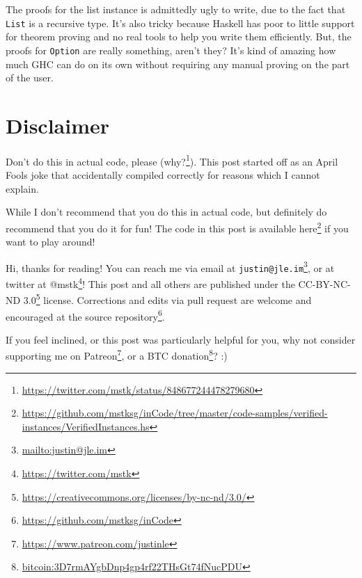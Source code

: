 \documentclass[]{article}
\renewcommand{\href}[2]{#2\footnote{\url{#1}}}
\begin{document}
The proofs for the list instance is admittedly ugly to write, due to the fact
that \texttt{List} is a recursive type. It's also tricky because Haskell has
poor to little support for theorem proving and no real tools to help you write
them efficiently. But, the proofs for \texttt{Option} are really something,
aren't they? It's kind of amazing how much GHC can do on its own without
requiring any manual proving on the part of the user.

\hypertarget{disclaimer}{%
\section{Disclaimer}\label{disclaimer}}

Don't do this in actual code, please
(\href{https://twitter.com/mstk/status/848677244478279680}{why?}). This post
started off as an April Fools joke that accidentally compiled correctly for
reasons which I cannot explain.

While I don't recommend that you do this in actual code, but definitely do
recommend that you do it for fun! The code in this post is available
\href{https://github.com/mstksg/inCode/tree/master/code-samples/verified-instances/VerifiedInstances.hs}{here}
if you want to play around!

Hi, thanks for reading! You can reach me via email at
\href{mailto:justin@jle.im}{\nolinkurl{justin@jle.im}}, or at twitter at
\href{https://twitter.com/mstk}{@mstk}! This post and all others are published
under the \href{https://creativecommons.org/licenses/by-nc-nd/3.0/}{CC-BY-NC-ND
3.0} license. Corrections and edits via pull request are welcome and encouraged
at \href{https://github.com/mstksg/inCode}{the source repository}.

If you feel inclined, or this post was particularly helpful for you, why not
consider \href{https://www.patreon.com/justinle}{supporting me on Patreon}, or a
\href{bitcoin:3D7rmAYgbDnp4gp4rf22THsGt74fNucPDU}{BTC donation}? :)
\end{document}

